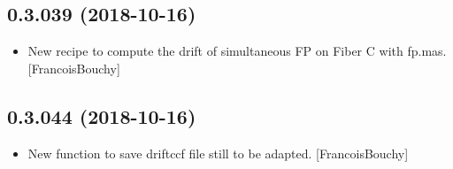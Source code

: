 \documentclass[a4paper,10pt,english]{report}
\begin{document}
\subsection{0.3.039 (2018-10-16)}
\label{\detokenize{misc/changelog:id292}}\begin{itemize}
\item {} 
New recipe to compute the drift of simultaneous FP on Fiber C with
fp.mas. {[}FrancoisBouchy{]}

\end{itemize}


\subsection{0.3.044 (2018-10-16)}
\label{\detokenize{misc/changelog:id293}}\begin{itemize}
\item {} 
New function  to save driftccf file
 still to be adapted. {[}FrancoisBouchy{]}

\end{itemize}
\end{document}
